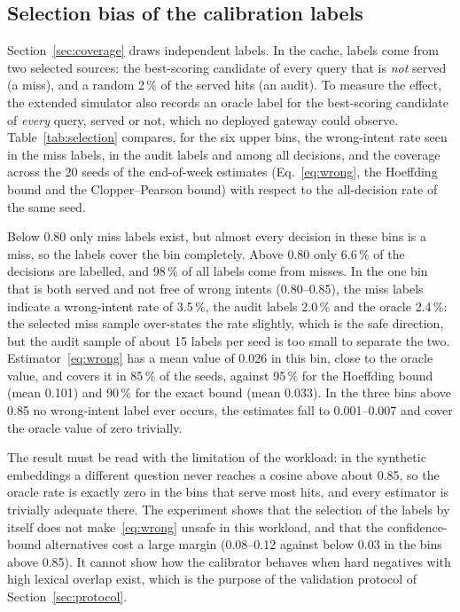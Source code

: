 \documentclass[journal]{IEEEtran}
\newcommand{\pct}{\,\%}
\begin{document}
\subsection{Selection bias of the calibration labels}\label{sec:selection}
Section~\ref{sec:coverage} draws independent labels. In the cache, labels come from two selected sources: the best-scoring candidate of every query that is \emph{not} served (a miss), and a random 2\pct{} of the served hits (an audit). To measure the effect, the extended simulator also records an oracle label for the best-scoring candidate of \emph{every} query, served or not, which no deployed gateway could observe. Table~\ref{tab:selection} compares, for the six upper bins, the wrong-intent rate seen in the miss labels, in the audit labels and among all decisions, and the coverage across the 20 seeds of the end-of-week estimates (Eq.~\eqref{eq:wrong}, the Hoeffding bound and the Clopper--Pearson bound) with respect to the all-decision rate of the same seed.

Below 0.80 only miss labels exist, but almost every decision in these bins is a miss, so the labels cover the bin completely. Above 0.80 only 6.6\pct{} of the decisions are labelled, and 98\pct{} of all labels come from misses. In the one bin that is both served and not free of wrong intents (0.80--0.85), the miss labels indicate a wrong-intent rate of 3.5\pct{}, the audit labels 2.0\pct{} and the oracle 2.4\pct{}: the selected miss sample over-states the rate slightly, which is the safe direction, but the audit sample of about 15 labels per seed is too small to separate the two. Estimator~\eqref{eq:wrong} has a mean value of 0.026 in this bin, close to the oracle value, and covers it in 85\pct{} of the seeds, against 95\pct{} for the Hoeffding bound (mean 0.101) and 90\pct{} for the exact bound (mean 0.033). In the three bins above 0.85 no wrong-intent label ever occurs, the estimates fall to 0.001--0.007 and cover the oracle value of zero trivially.

The result must be read with the limitation of the workload: in the synthetic embeddings a different question never reaches a cosine above about 0.85, so the oracle rate is exactly zero in the bins that serve most hits, and every estimator is trivially adequate there. The experiment shows that the selection of the labels by itself does not make~\eqref{eq:wrong} unsafe in this workload, and that the confidence-bound alternatives cost a large margin (0.08--0.12 against below 0.03 in the bins above 0.85). It cannot show how the calibrator behaves when hard negatives with high lexical overlap exist, which is the purpose of the validation protocol of Section~\ref{sec:protocol}.
\end{document}
